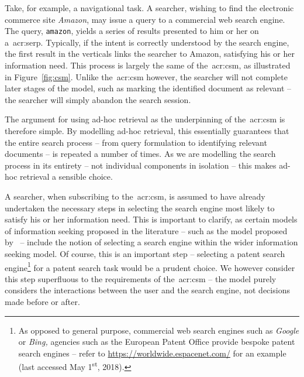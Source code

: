Take, for example, a navigational task. A searcher, wishing to find the electronic commerce site \emph{Amazon}, may issue a query to a commercial web search engine. The query, \texttt{amazon}, yields a series of results presented to him or her on a~\gls{acr:serp}. Typically, if the intent is correctly understood by the search engine, the first result in the verticals links the searcher to Amazon, satisfying his or her information need. This process is largely the same of the~\gls{acr:csm}, as illustrated in Figure~\ref{fig:csm}. Unlike the~\gls{acr:csm} however, the searcher will not complete later stages of the model, such as marking the identified document as relevant -- the searcher will simply abandon the search session.

The argument for using ad-hoc retrieval as the underpinning of the~\gls{acr:csm} is therefore simple. By modelling ad-hoc retrieval, this essentially guarantees that the entire search process -- from query formulation to identifying relevant documents -- is repeated a number of times. As we are modelling the search process in its entirety -- not individual components in isolation -- this makes ad-hoc retrieval a sensible choice.

\noindent
{} A searcher, when subscribing to the~\gls{acr:csm}, is assumed to have already undertaken the necessary steps in selecting the search engine most likely to satisfy his or her information need. This is important to clarify, as certain models of information seeking proposed in the literature -- such as the model proposed by~\cite{thomas2014modelling_behaviour} -- include the notion of selecting a search engine within the wider information seeking model. Of course, this is an important step -- selecting a patent search engine\footnote{As opposed to general purpose, commercial web search engines such as \emph{Google} or \emph{Bing,} agencies such as the European Patent Office provide bespoke patent search engines -- refer to \url{https://worldwide.espacenet.com/} for an example (last accessed May 1\textsuperscript{st}, 2018).} for a patent search task would be a prudent choice. We however consider this step superfluous to the requirements of the~\gls{acr:csm} -- the model purely considers the interactions between the user and the search engine, not decisions made before or after.

